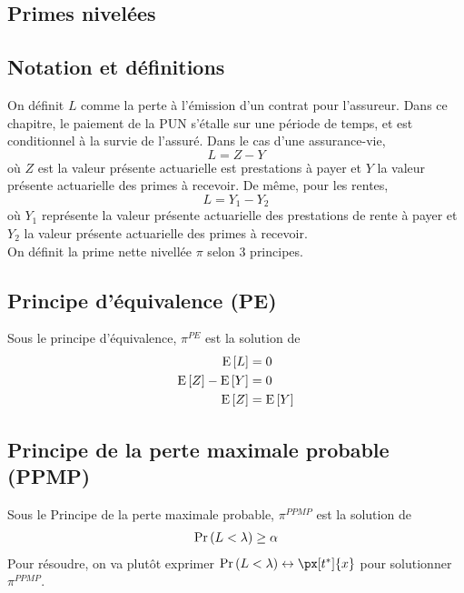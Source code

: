 \documentclass[10pt, french]{article}
\begin{document}
\begin{multicols*}{3}
\section{Primes nivelées}
\subsection{Notation et définitions}
On définit $L$ comme la perte à l'émission d'un contrat pour l'assureur. Dans ce chapitre, le paiement de la PUN s'étalle sur une période de temps, et est conditionnel  à la survie de l'assuré. Dans le cas d'une assurance-vie,
\[L = Z - Y\]
où $Z$ est la valeur présente actuarielle est prestations à payer et $Y$ la valeur présente actuarielle des primes à recevoir. De même, pour les rentes,
\[L = Y_1 - Y_2\]
où $Y_1$ représente la valeur présente actuarielle des prestations de rente à payer et $Y_2$ la valeur présente actuarielle des primes à recevoir. \\

On définit la prime nette nivellée $\pi$ selon 3 principes. 

\subsection{Principe d'équivalence (PE)}
Sous le principe d'équivalence, $\pi^{PE}$ est la solution de
\begin{align*}
\mathrm{E} \left[ L \right]	& = 0 \\
\mathrm{E} \left[ Z \right] - \mathrm{E} \left[ Y \right]	& = 0 \\
\mathrm{E} \left[ Z \right] & = \mathrm{E} \left[ Y \right] \\
\end{align*}


\subsection{Principe de la perte maximale probable (PPMP)}
Sous le Principe de la perte maximale probable, $\pi^{PPMP}$ est la solution de
\begin{align*}
\Pr \left( L < \lambda \right) \geq \alpha
\end{align*}
Pour résoudre, on va plutôt exprimer $\prob{L < \lambda} \leftrightarrow \px[t^*]{x}$ pour solutionner $\pi^{PPMP}$.



\end{multicols*}
\end{document}
